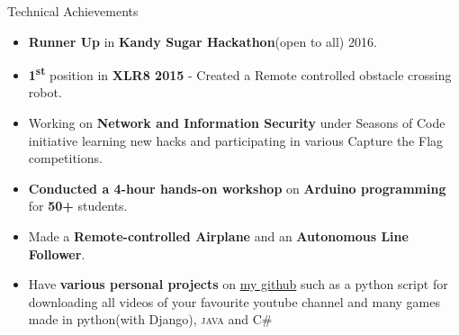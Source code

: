 \documentclass{resume_ssl}
\begin{document}
\begin{Section}{Technical Achievements}
\normalsize
{
\begin{itemize}
\item{\textbf{Runner Up} in \textbf{Kandy Sugar Hackathon}(open to all) 2016.}
\item{\textbf{1\textsuperscript{st}} position in \textbf{XLR8 2015} - Created a Remote controlled obstacle crossing robot.}
\item{Working on \textbf{Network and Information Security} under Seasons of Code initiative  learning new hacks and participating in various Capture the Flag competitions.}
\item{\textbf{Conducted a 4-hour hands-on workshop} on \textbf{Arduino programming} for \textbf{50+} students.}
\item{Made a \textbf{Remote-controlled Airplane} and an \textbf{Autonomous Line Follower}.}
\item{Have \textbf{various personal projects} on \href{https://github.com/CodeMaxx}{my github} such as a python script for downloading all videos of your favourite youtube channel and many games made in python(with Django), \textsc{java} and C\#}
\end{itemize}
}
\end{Section}
\end{document}
